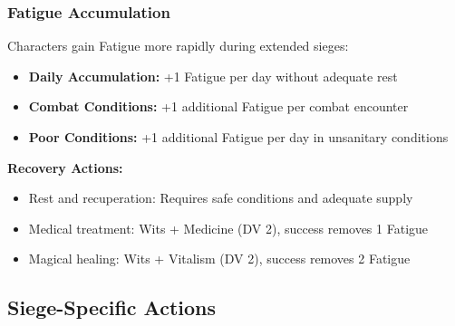\subsubsection{Fatigue Accumulation}
Characters gain Fatigue more rapidly during extended sieges:
\begin{itemize}[leftmargin=*]
    \item \textbf{Daily Accumulation:} +1 Fatigue per day without adequate rest
    \item \textbf{Combat Conditions:} +1 additional Fatigue per combat encounter
    \item \textbf{Poor Conditions:} +1 additional Fatigue per day in unsanitary conditions
\end{itemize}

\textbf{Recovery Actions:}
\begin{itemize}[leftmargin=*]
    \item Rest and recuperation: Requires safe conditions and adequate supply
    \item Medical treatment: Wits + Medicine (DV 2), success removes 1 Fatigue
    \item Magical healing: Wits + Vitalism (DV 2), success removes 2 Fatigue
\end{itemize}

\subsection{Siege-Specific Actions}


